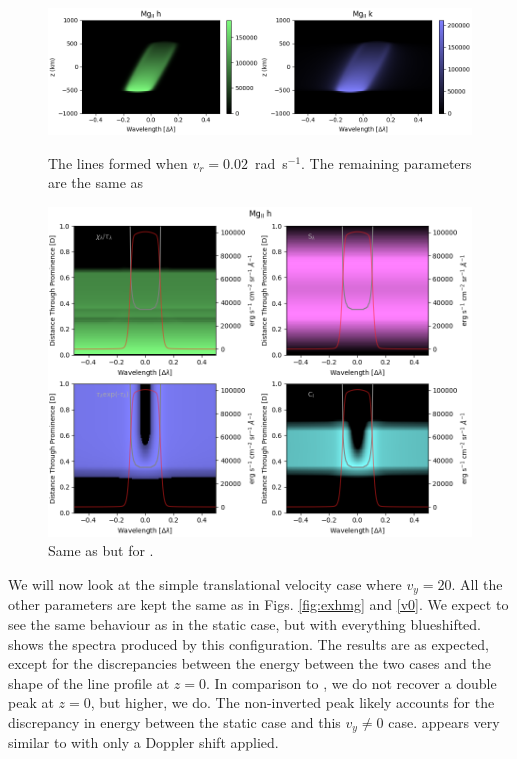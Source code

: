 \begin{figure}
    \centering
    \includegraphics[width=\linewidth]{./03Modelling2D/figs/matplots/mgvrcont.png}
    \caption{The \mgiihk{} lines formed when $v_r=0.02$~rad~s$^{-1}$. The remaining parameters are the same as }
    \label{vr002c} \vspace{20pt}
    \includegraphics[width=\linewidth]{./03Modelling2D/figs/matplots/mghvr.png}
    \caption{Same as  but for .}
    \label{vr002}
\end{figure}
We will now look at the simple translational velocity case where $v_y=20$\kms. All the other parameters are kept the same as in Figs. \ref{fig:exhmg} and \ref{v0}. We expect to see the same behaviour as in the static case, but with everything blueshifted.  shows the spectra produced by this configuration. The results are as expected, except for the discrepancies between the energy between the two cases and the shape of the line profile at $z=0$. In comparison to , we do not recover a double peak at $z=0$, but higher, we do. The non-inverted peak likely accounts for the discrepancy in energy between the static case and this $v_y\neq0$ case.  appears very similar to  with only a Doppler shift applied.


